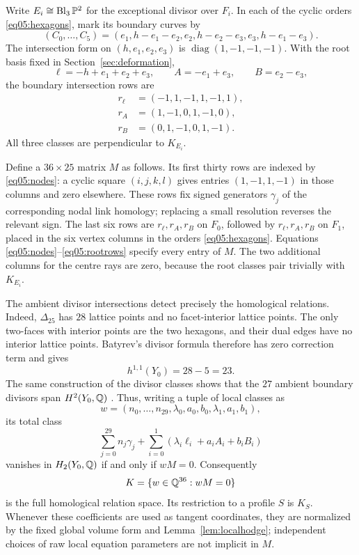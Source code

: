 Write $E_i\cong\operatorname{Bl}_3\mathbb{P}^2$ for the exceptional divisor over
$F_i$.  In each of the cyclic orders \eqref{eq05:hexagons}, mark its
boundary curves by
\begin{equation}\label{eq05:boundary}
 (C_0,\ldots,C_5)=
 (e_1,h-e_1-e_2,e_2,h-e_2-e_3,e_3,h-e_1-e_3).
\end{equation}
The intersection form on $(h,e_1,e_2,e_3)$ is
$\operatorname{diag}(1,-1,-1,-1)$.  With the root basis fixed in
Section~\ref{sec:deformation},
\[
 \ell=-h+e_1+e_2+e_3,\qquad A=-e_1+e_3,\qquad B=e_2-e_3,
\]
the boundary intersection rows are
\begin{equation}\label{eq05:rootrows}
\begin{aligned}
 r_\ell&=(-1,1,-1,1,-1,1),\\
 r_A&=(1,-1,0,1,-1,0),\\
 r_B&=(0,1,-1,0,1,-1).
\end{aligned}
\end{equation}
All three classes are perpendicular to $K_{E_i}$.

Define a $36\times25$ matrix $M$ as follows.  Its first thirty rows are
indexed by \eqref{eq05:nodes}: a cyclic square $(i,j,k,l)$ gives entries
$(1,-1,1,-1)$ in those columns and zero elsewhere.  These rows fix signed
generators $\gamma_j$ of the corresponding nodal link homology; replacing
a small resolution reverses the relevant sign.  The last six rows are
$r_\ell,r_A,r_B$ on $F_0$, followed by $r_\ell,r_A,r_B$ on $F_1$, placed
in the six vertex columns in the orders \eqref{eq05:hexagons}.  Equations
\eqref{eq05:nodes}--\eqref{eq05:rootrows} specify every entry of $M$.
The two additional columns for the centre rays are zero, because the
root classes pair trivially with $K_{E_i}$.

The ambient divisor intersections detect precisely the homological
relations.  Indeed, $\Delta_{25}$ has $28$ lattice points and no facet-interior
lattice points.  The only two-faces with interior points are the two
hexagons, and their dual edges have no interior lattice points.
Batyrev's divisor formula therefore has zero correction term and gives
\begin{equation}\label{eq05:h11}
 h^{1,1}(Y_0)=28-5=23.
\end{equation}
The same construction of the divisor classes shows that the $27$ ambient
boundary divisors span $H^2(Y_0,\mathbb{Q})$
\cite[Theorem~4.4.2 and Corollary~4.5.1]{Batyrev94}.  Thus, writing a
tuple of local classes as
\[
 w=(n_0,\ldots,n_{29},\lambda_0,a_0,b_0,\lambda_1,a_1,b_1),
\]
its total class
\begin{equation}\label{eq05:totalclass}
 \sum_{j=0}^{29}n_j\gamma_j+
 \sum_{i=0}^1(\lambda_i\ell_i+a_i A_i+b_i B_i)
\end{equation}
vanishes in $H_2(Y_0,\mathbb{Q})$ if and only if $wM=0$.
Consequently
\[
 K=\{w\in\mathbb{Q}^{36}:wM=0\}
\]
is the full homological relation space.  Its restriction to a profile
$S$ is $K_S$.  Whenever these coefficients are used as tangent
coordinates, they are normalized by the fixed global volume form and
Lemma~\ref{lem:localhodge}; independent choices of raw local equation
parameters are not implicit in $M$.

